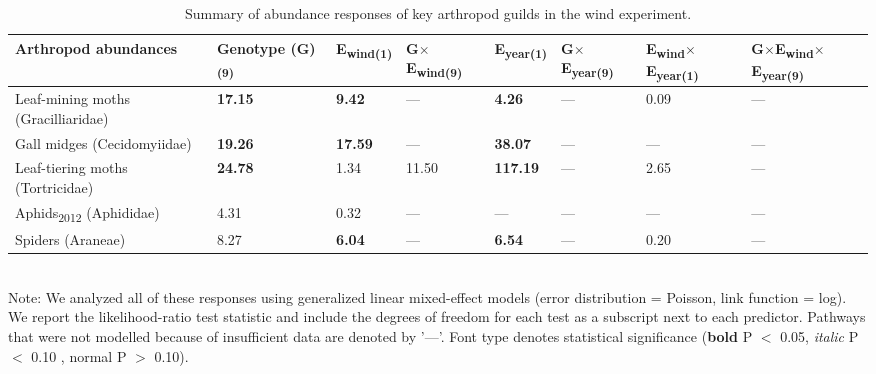 \documentclass[11pt]{article}
\begin{document}
\begin{table}
\centering
\caption{Summary of abundance responses of key arthropod
guilds in the wind experiment.}
\label{wGuild}
\begin{tabular}{@{}llllllll@{}}
\toprule
Arthropod abundances & Genotype (G)\textsubscript{(9)} &
E\textsubscript{wind(1)} & G$\times$E\textsubscript{wind(9)} & E\textsubscript{year(1)} & G$\times$E\textsubscript{year(9)} & E\textsubscript{wind}$\times$E\textsubscript{year(1)} & G$\times$E\textsubscript{wind}$\times$E\textsubscript{year(9)}\tabularnewline
\midrule
Leaf-mining moths (Gracilliaridae) & \textbf{17.15} & \textbf{9.42} & ---
& \textbf{4.26} & --- & 0.09 & ---\tabularnewline
Gall midges (Cecidomyiidae) & \textbf{19.26} & \textbf{17.59} & --- &
\textbf{38.07} & --- & --- & ---\tabularnewline
Leaf-tiering moths (Tortricidae) & \textbf{24.78} & 1.34 & 11.50 &
\textbf{117.19} & --- & 2.65 & ---\tabularnewline
Aphids\textsubscript{2012} (Aphididae) & 4.31 & 0.32 & --- & --- & --- & --- & ---\tabularnewline
Spiders (Araneae) & 8.27 & \textbf{6.04} & --- & \textbf{6.54} & --- & 0.20
& ---\tabularnewline
\bottomrule
\end{tabular}
\bigskip{} 
\\
{\footnotesize Note: We analyzed all of these responses
using generalized linear mixed-effect models (error distribution = Poisson, link function = log). We report the likelihood-ratio test statistic and include the degrees of freedom for each test as a subscript next to each predictor. Pathways that were not modelled because of insufficient data are denoted by '---'. Font type denotes statistical significance (\textbf{bold} P $<$ 0.05, \textit{italic} P $<$ 0.10 , normal P $>$ 0.10).}
\end{table}
 
\end{document}
